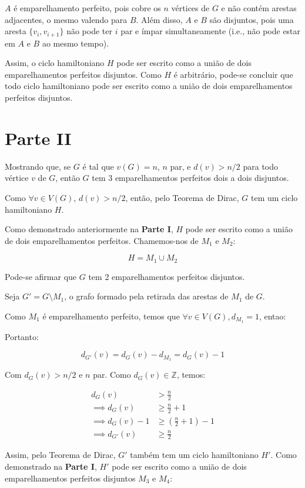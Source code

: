 \documentclass{article}
\begin{document}
 $A$ é emparelhamento perfeito, pois cobre os $n$ vértices de $G$ e não contém arestas adjacentes, o mesmo valendo para $B$. Além disso, $A$ e $B$ são disjuntos, pois uma aresta $\{v_i, v_{i+1}\}$ não pode ter $i$ par e ímpar simultaneamente (i.e., não pode estar em $A$ e $B$ ao mesmo tempo).
 
 Assim, o ciclo hamiltoniano $H$ pode ser escrito como a união de dois emparelhamentos perfeitos disjuntos. Como $H$ é arbitrário, pode-se concluir que todo ciclo hamiltoniano pode ser escrito como a união de dois emparelhamentos perfeitos disjuntos.
 
 \section*{Parte II}
 
 Mostrando que, se $G$ é tal que $v(G) = n$, $n$ par, e $d(v) > n/2$ para todo vértice $v$ de $G$, então $G$ tem 3 emparelhamentos perfeitos dois a dois disjuntos.
 
 Como $\forall v \in V(G)$, $d(v) > n/2$, então, pelo Teorema de Dirac, $G$ tem um ciclo hamiltoniano $H$. 
 
 Como demonstrado anteriormente na \textbf{Parte I}, $H$ pode ser escrito como a união de dois emparelhamentos perfeitos. Chamemos-nos de $M_1$ e $M_2$:
 
 $$
 H = M_1 \cup M_2
 $$
 
 Pode-se afirmar que $G$ tem 2 emparelhamentos perfeitos disjuntos.
 
 Seja $G' = G \setminus M_1$, o grafo formado pela retirada das arestas de $M_1$ de $G$.
 
 Como $M_1$ é emparelhamento perfeito, temos que $\forall v \in V(G), d_{M_1} = 1$, entao: 
 
 Portanto:
 
 $$
 d_{G'}(v) = d_G(v) - d_{M_1}  =  d_G(v) - 1
 $$
 
 Com $d_G(v) > n/2$ e $n$ par. Como $d_G(v) \in \mathbb{Z}$, temos:
 
 \begin{align*}
 	d_G(v) &> \frac{n}{2} \\
 	\implies d_{G}(v) &\geq \frac{n}{2}  + 1\\
    \implies d_G(v) - 1 &\geq (\frac{n}{2} + 1) - 1 \\
  	\implies d_{G'}(v) &\geq \frac{n}{2}
 \end{align*}
 
 Assim, pelo Teorema de Dirac, $G'$ também tem um ciclo hamiltoniano $H'$. Como demonstrado na \textbf{Parte I}, $H'$ pode ser escrito como a união de dois emparelhamentos perfeitos disjuntos $M_3$ e $M_4$:
 
\end{document}
